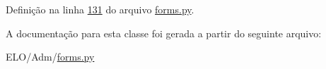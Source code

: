 Definição na linha \hyperlink{Adm_2forms_8py_source_l00131}{131} do arquivo \hyperlink{Adm_2forms_8py_source}{forms.\-py}.



A documentação para esta classe foi gerada a partir do seguinte arquivo\-:\begin{DoxyCompactItemize}
\item 
E\-L\-O/\-Adm/\hyperlink{Adm_2forms_8py}{forms.\-py}\end{DoxyCompactItemize}
